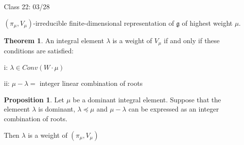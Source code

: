 \documentclass{article}
\theoremstyle{definition}
\newtheorem{theorem}{Theorem}
\newtheorem{proposition}{Proposition}
\begin{document}
\hrulefill

Class 22: 03/28

\((\pi_\mu,V_\mu)\)-irreducible finite-dimensional representation of \(\mathfrak{g}\) of highest weight \(\mu\).

\begin{theorem}
    An integral element \(\lambda\) is a weight of \(V_\mu\) if and only if these conditions are satisfied:
    
    i: \(\lambda \in Conv(W\cdot\mu)\)
    
    ii: \(\mu - \lambda =\) integer linear combination of roots

\end{theorem}

\begin{proposition}
    Let \(\mu\) be a dominant integral element. Suppose that the elemeent \(\lambda\) is dominant, \(\lambda \preceq \mu\) and \(\mu - \lambda\) can be expressed as an integer combination of roots.
    
    Then \(\lambda\) is a weight of \((\pi_\mu, V_\mu)\)  
\end{proposition}
\end{document}
